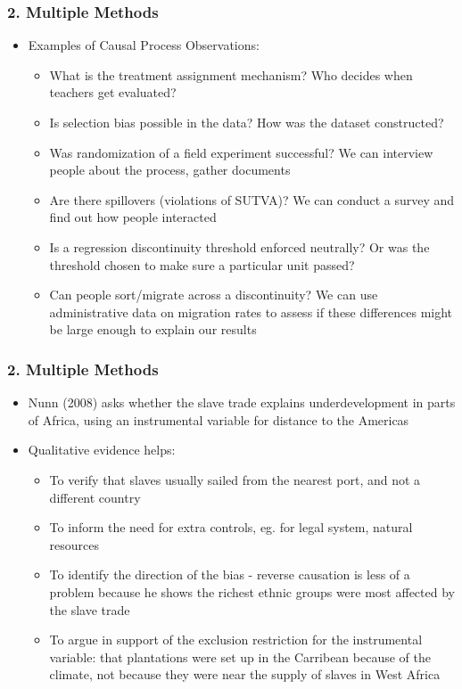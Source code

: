 \documentclass[xcolor=x11names,compress]{beamer}\usepackage[]{graphicx}\usepackage[]{color}
\renewcommand{\(}{\begin{columns}}
\renewcommand{\)}{\end{columns}}
\newcommand{\<}[1]{\begin{column}{#1}}
\renewcommand{\>}{\end{column}}
\begin{document}
\begin{frame}
\frametitle{2. Multiple Methods}
\begin{itemize}
\item Examples of Causal Process Observations:
\pause
\begin{itemize}
\item What is the treatment assignment mechanism? Who decides when teachers get evaluated?
\pause
\item Is selection bias possible in the data? How was the dataset constructed?
\pause
\item Was randomization of a field experiment successful? We can interview people about the process, gather documents
\pause
\item Are there spillovers (violations of SUTVA)? We can conduct a survey and find out how people interacted
\pause
\item Is a regression discontinuity threshold enforced neutrally? Or was the threshold chosen to make sure a particular unit passed?
\pause
\item Can people sort/migrate across a discontinuity? We can use administrative data on migration rates to assess if these differences might be large enough to explain our results
\end{itemize}
\end{itemize}
\end{frame}

\begin{frame}
\frametitle{2. Multiple Methods}
\begin{itemize}
\item Nunn (2008) asks whether the slave trade explains underdevelopment in parts of Africa, using an instrumental variable for distance to the Americas
\pause
\item Qualitative evidence helps:
\pause
\begin{itemize}
\item To verify that slaves usually sailed from the nearest port, and not a different country
\pause
\item To inform the need for extra controls, eg. for legal system, natural resources
\pause
\item To identify the direction of the bias - reverse causation is less of a problem because he shows the richest ethnic groups were most affected by the slave trade
\pause
\item To argue in support of the exclusion restriction for the instrumental variable: that plantations were set up in the Carribean because of the climate, not because they were near the supply of slaves in West Africa
\end{itemize}
\end{itemize}
\end{frame}
\end{document}
